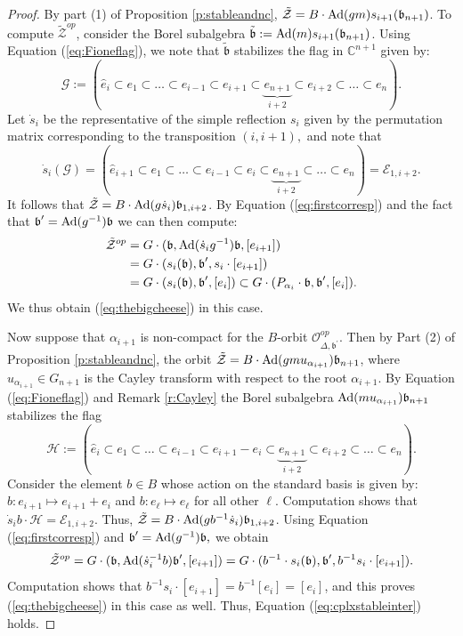 \documentclass[12pt]{amsart}
\numberwithin{equation}{section}
\newcommand{\cZ}{{\mathcal Z}}
\newcommand{\fb}{\mbox{${\mathfrak b}$}}
\newcommand{\C}{\mbox{${\mathbb C}$}}
\newcommand{\Ad}{{\rm Ad}}
\begin{document}
\begin{proof}
By part (1) of Proposition \ref{p:stableandnc}, $\tilde{\cZ}=B\cdot \Ad(gm) s_{i+1}(\fb_{n+1})$.  To compute
$\tilde{\cZ}^{op}$, consider the Borel subalgebra $\tilde{\fb}:=\Ad(m) s_{i+1}(\fb_{n+1})$.  Using Equation (\ref{eq:Fioneflag}), we note that $\tilde{\fb}$ stabilizes the flag in $\C^{n+1}$ given by:
$$
\mathcal{G}:=(\hat{e}_{i}\subset e_{1}\subset\dots \subset e_{i-1}\subset e_{i+1}\subset\underbrace{e_{n+1}}_{i+2}\subset e_{i+2} \subset \dots\subset e_{n}).
$$
Let $\dot{s}_{i}$ be the representative of the simple reflection $s_{i}$ given by the permutation matrix corresponding to the transposition $(i, i+1),$ and note that
 $$
\dot{s}_{i}(\mathcal{G})=(\hat{e}_{i+1}\subset e_{1}\subset\dots \subset e_{i-1}\subset e_{i}\subset\underbrace{e_{n+1}}_{i+2}\subset\dots\subset e_{n})=\mathcal{E}_{1,i+2}.
 $$
 It follows that  $\tilde{\cZ}=B\cdot \Ad(g\dot{s}_{i})\fb_{1,i+2}$.  By Equation (\ref{eq:firstcorresp}) and the fact that $\fb^{\prime}=\Ad(g^{-1})\fb$ we can then compute: 
 \begin{equation}\label{eq:cplxcase}
 \begin{split}
 \tilde{\cZ}^{op}&=G\cdot(\fb, \Ad(\dot{s}_{i}g^{-1})\fb, [e_{i+1}])\\
 &=G\cdot (s_{i}(\fb), \fb^{\prime}, s_{i}\cdot[e_{i+1}])\\
 &=G\cdot (s_{i}(\fb), \fb^{\prime}, [e_{i}])\subset G\cdot (P_{\alpha_{i}}\cdot\fb, \fb^{\prime}, [e_{i}]).
 \end{split}
 \end{equation}
We thus obtain (\ref{eq:thebigcheese}) in this case.
  
 Now suppose that $\alpha_{i+1}$ is non-compact for the $B$-orbit $\mathcal{O}_{\Delta,\fb^{\prime}}^{op}$.  Then by 
 Part (2) of Proposition \ref{p:stableandnc}, the orbit 
 $\tilde{\cZ}=B\cdot \Ad(gmu_{\alpha_{i+1}})\fb_{n+1}$, where $u_{\alpha_{i+1}}\in G_{n+1}$ is the Cayley transform with respect to the root $\alpha_{i+1}$.  By Equation (\ref{eq:Fioneflag}) and Remark \ref{r:Cayley} the Borel subalgebra $\Ad(mu_{\alpha_{i+1}})\fb_{n+1}$ stabilizes the flag 
 $$
 \mathcal{H}:=(\hat{e}_{i}\subset e_{1}\subset \dots\subset e_{i-1}\subset e_{i+1}-e_{i}\subset \underbrace{e_{n+1}}_{i+2}\subset e_{i+2} \subset \dots\subset e_{n}).
 $$
Consider the element $b\in B$ whose action on the standard basis is given by: $b:e_{i+1}\mapsto e_{i+1}+e_{i}$ and $b:e_{\ell}\mapsto e_{\ell}$ for all other $\ell$. 
Computation shows that $\dot{s}_{i}b\cdot \mathcal{H}=\mathcal{E}_{1,i+2}$.  Thus, 
$\tilde{\cZ}=B\cdot \Ad(gb^{-1}\dot{s}_{i})\fb_{1,i+2}$.  Using Equation (\ref{eq:firstcorresp}) and $\fb^{\prime}=\Ad(g^{-1})\fb,$ we obtain 
$$
\tilde{\cZ}^{op}=G\cdot(\fb, \Ad(\dot{s}_{i}^{-1}b)\fb^{\prime}, [e_{i+1}])=G\cdot(b^{-1}\cdot s_{i}(\fb), \fb^{\prime}, b^{-1}s_{i}\cdot [e_{i+1}]).
$$
Computation shows that $b^{-1} s_{i}\cdot[e_{i+1}]=b^{-1}[e_{i}]=[e_{i}]$, and this proves (\ref{eq:thebigcheese}) in this case as well.  Thus, Equation (\ref{eq:cplxstableinter}) holds.


\end{proof}
\end{document}
